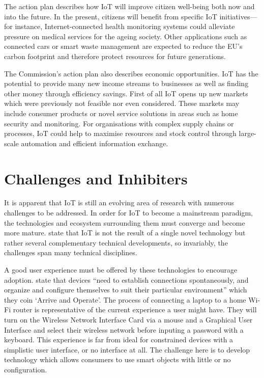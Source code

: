    The action plan \citep{ECIoT:2009} describes how IoT will improve citizen well-being both now and into the future. In the present, citizens will benefit from specific IoT initiatives---for instance, Internet-connected health monitoring systems could alleviate pressure on medical services for the ageing society. Other applications such as connected cars or smart waste management are expected to reduce the EU's carbon footprint and therefore protect resources for future generations.

    The Commission's action plan also describes economic opportunities. IoT has the potential to provide many new income streams to businesses as well as finding other money through efficiency savings. First of all IoT opens up new markets which were previously not feasible nor even considered. These markets may include consumer products or novel service solutions in areas such as home security and monitoring. For organisations with complex supply chains or processes, IoT could help to maximise resources and stock control through large-scale automation and efficient information exchange.

  \section{Challenges and Inhibiters}
  \label{challenges}
    It is apparent that IoT is still an evolving area of research with numerous challenges to be addressed. In order for IoT to become a mainstream paradigm, the technologies and ecosystem surrounding them must converge and become more mature. \citet{fromIoC} state that IoT is not the result of a single novel technology but rather several complementary technical developments, so invariably, the challenges span many technical disciplines. 

    A good user experience must be offered by these technologies to encourage adoption. \citet{fromIoC} state that devices ``need to establish connections spontaneously, and organize and configure themselves to suit their particular environment'' which they coin `Arrive and Operate'. The process of connecting a laptop to a home Wi-Fi router is representative of the current experience a user might have. They will turn on the Wireless Network Interface Card via a mouse and a Graphical User Interface and select their wireless network before inputing a password with a keyboard. This experience is far from ideal for constrained devices with a simplistic user interface, or no interface at all. The challenge here is to develop technology which allows consumers to use smart objects with little or no configuration.

